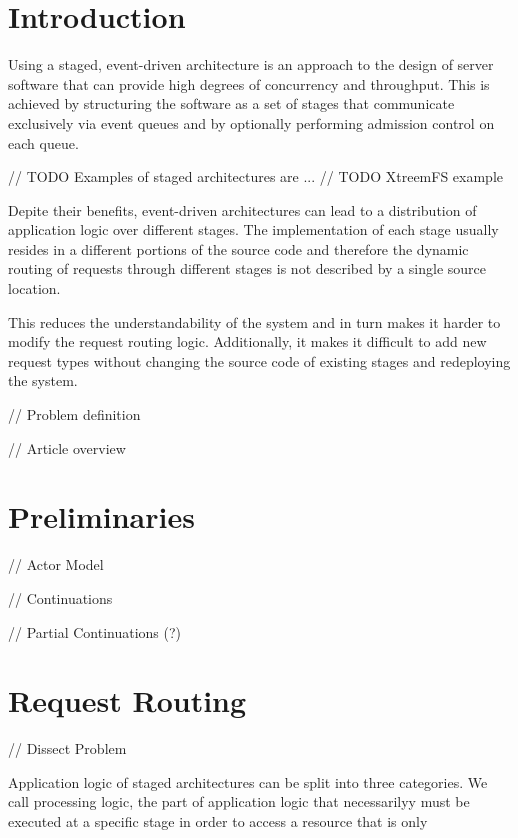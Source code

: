 \documentclass{sig-alternate}
\begin{document}
\section{Introduction}             

Using a staged, event-driven architecture is an approach to the design of server software that can 
provide high degrees of concurrency and throughput.  This is achieved by structuring the software as
a set of stages that communicate exclusively via event queues and by optionally performing admission 
control on each queue.  

// TODO Examples of staged architectures are ...
// TODO XtreemFS example

Depite their benefits, event-driven architectures can lead to a distribution of application logic
over different stages. The implementation of each stage usually resides in a different portions of
the source code and therefore the dynamic routing of requests through different stages is not
described by a single source location.

This reduces the understandability of the system and in turn makes it harder to modify the request
routing logic. Additionally, it makes it difficult to add new request types without changing the
source code of existing stages and redeploying the system.

// Problem definition

// Article overview
                                
                         
\section{Preliminaries}

// Actor Model

// Continuations

// Partial Continuations (?)

                         

\section{Request Routing}

// Dissect Problem                          

Application logic of staged architectures can be split into three categories.  We call processing 
logic, the part of application logic that necessarilyy must be executed at a specific stage in order
to access a resource that is only
                                                                                       
\end{document}
